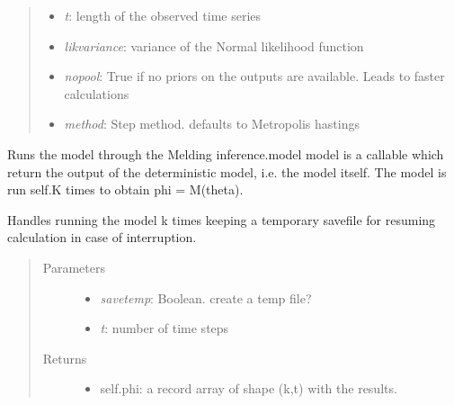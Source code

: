 \documentclass[a4paper,10pt,english]{sphinxmanual}
\begin{document}
\begin{fulllineitems}
\begin{fulllineitems}
\begin{quote}
\begin{description}
\begin{itemize}
\item {} 
\emph{t}: length of the observed time series

\item {} 
\emph{likvariance}: variance of the Normal likelihood function

\item {} 
\emph{nopool}: True if no priors on the outputs are available. Leads to faster calculations

\item {} 
\emph{method}: Step method. defaults to Metropolis hastings

\end{itemize}

\end{description}\end{quote}

\end{fulllineitems}


\begin{fulllineitems}
\label{BIP.Bayes:BIP.Bayes.Melding.Meld.run}
Runs the model through the Melding inference.model
model is a callable which return the output of the deterministic model,
i.e. the model itself.
The model is run self.K times to obtain phi = M(theta).

\end{fulllineitems}


\begin{fulllineitems}
\label{BIP.Bayes:BIP.Bayes.Melding.Meld.runModel}
Handles running the model k times keeping a temporary savefile for
resuming calculation in case of interruption.
\begin{quote}\begin{description}
\item[{Parameters}] \leavevmode\begin{itemize}
\item {} 
\emph{savetemp}: Boolean. create a temp file?

\item {} 
\emph{t}: number of time steps

\end{itemize}

\item[{Returns}] \leavevmode\begin{itemize}
\item {} 
self.phi: a record array of shape (k,t) with the results.


\end{itemize}
\end{description}
\end{quote}
\end{fulllineitems}
\end{fulllineitems}
\end{document}
